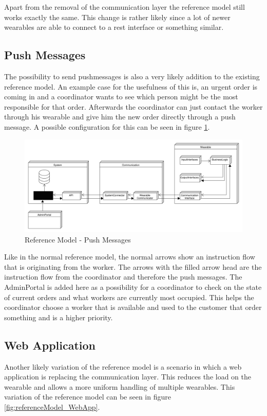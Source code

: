 Apart from the removal of the communication layer the reference model still works exactly the same. This change is rather likely since a lot of newer wearables are able to connect to a rest interface or something similar.

\subsection{Push Messages}
The possibility to send \gls{pushmessage}s is also a very likely addition to the existing reference model. An example case for the usefulness of this is, an urgent order is coming in and a coordinator wants to see which person might be the most responsible for that order. Afterwards the coordinator can just contact the worker through his wearable and give him the new order directly through a push message. A possible configuration for this can be seen in figure \ref{fig:referenceModel_PushMessages}.
\clearpage

\begin{figure}[htbp]
	\includegraphics[width=\linewidth]{images/PackageModel_ReferenceArchitecture_PushMessages}
	\caption{Reference Model - Push Messages}
	\label{fig:referenceModel_PushMessages}
\end{figure}

Like in the normal reference model, the normal arrows show an instruction flow that is originating from the worker. The arrows with the filled arrow head are the instruction flow from the coordinator and therefore the push messages. The AdminPortal is added here as a possibility for a coordinator to check on the state of current orders and what workers are currently most occupied. This helps the coordinator choose a worker that is available and used to the customer that order something and is a higher priority.

\subsection{Web Application}
Another likely variation of the reference model is a scenario in which a web application is replacing the communication layer. This reduces the load on the wearable and allows a more uniform handling of multiple wearables. This variation of the reference model can be seen in figure \ref{fig:referenceModel_WebApp}.

